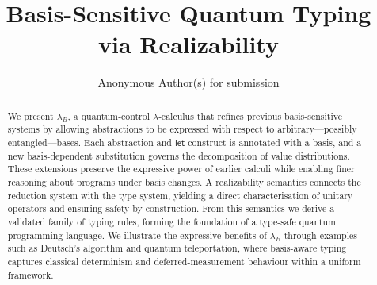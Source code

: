 \documentclass[runningheads,orivec,envcountsame,envcountsect]{llncs}
\newcommand{\lambdaB}{\lambda_B}
\begin{document}
\title{Basis-Sensitive Quantum Typing via Realizability}

\author{Anonymous Author(s) for submission}

%
%

\maketitle 

\begin{abstract}
  We present $\lambdaB$, a quantum‐control $\lambda$‐calculus that refines
  previous basis-sensitive systems by allowing abstractions to be expressed with
  respect to arbitrary---possibly entangled---bases.  Each abstraction and
  $\mathsf{let}$ construct is annotated with a basis, and a new basis-dependent
  substitution governs the decomposition of value distributions.  These
  extensions preserve the expressive power of earlier calculi while enabling
  finer reasoning about programs under basis changes.  A realizability semantics
  connects the reduction system with the type system, yielding a direct
  characterisation of unitary operators and ensuring safety by construction.
  From this semantics we derive a validated family of typing rules, forming the
  foundation of a type-safe quantum programming language.  We illustrate the
  expressive benefits of $\lambdaB$ through examples such as Deutsch’s algorithm
  and quantum teleportation, where basis-aware typing captures classical
  determinism and deferred-measurement behaviour within a uniform framework.

\end{abstract}
\end{document}
